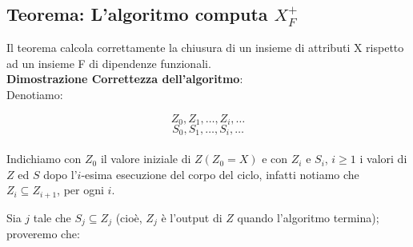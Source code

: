 \documentclass{article}
\begin{document}
\subsection{Teorema: L'algoritmo computa $X_{F}^{+}$}
Il teorema calcola correttamente la chiusura di un insieme di attributi X rispetto ad un insieme F di dipendenze funzionali.\\

\textbf{Dimostrazione Correttezza dell'algoritmo}:\\

Denotiamo:\par

\[Z_{0}, Z_{1}, \dots, Z_{i}, \dots \]
\[S_{0}, S_{1}, \dots, S_{i}, \dots\]\\

Indichiamo con $Z_{0}$ il valore iniziale di $Z (Z_{0} = X)$ e con $Z_{i}$ e $S_{i}$, $i \geq 1$ i valori di $Z$ ed $S$ dopo l'$i$-esima esecuzione del corpo del ciclo, infatti notiamo che $Z_{i} \subseteq Z_{i+1}$, per ogni $i$.\par
Sia $j$ tale che $S_{j} \subseteq Z_{j}$ (cioè,  $Z_{j}$ è l'output di $Z$ quando l'algoritmo termina); proveremo che:
\end{document}
